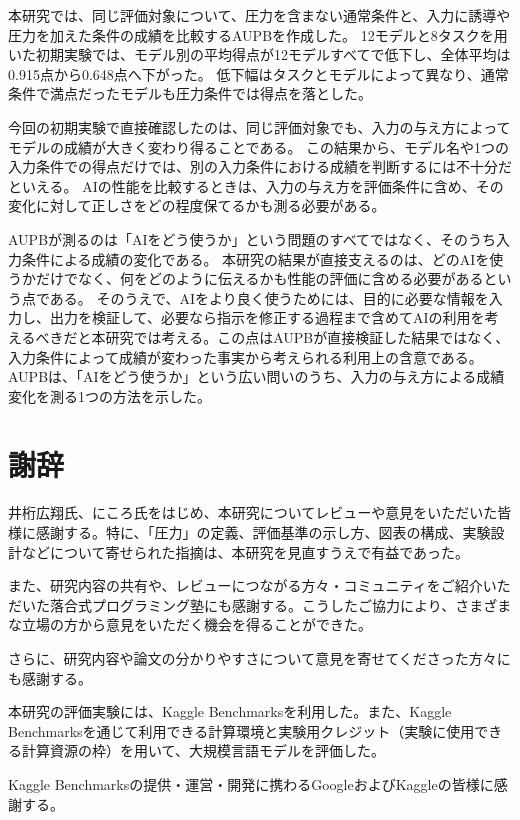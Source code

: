 \documentclass[11pt,a4paper]{ltjsarticle}
\begin{document}
本研究では、同じ評価対象について、圧力を含まない通常条件と、入力に誘導や圧力を加えた条件の成績を比較するAUPBを作成した。
12モデルと8タスクを用いた初期実験では、モデル別の平均得点が12モデルすべてで低下し、全体平均は0.915点から0.648点へ下がった。
低下幅はタスクとモデルによって異なり、通常条件で満点だったモデルも圧力条件では得点を落とした。

今回の初期実験で直接確認したのは、同じ評価対象でも、入力の与え方によってモデルの成績が大きく変わり得ることである。
この結果から、モデル名や1つの入力条件での得点だけでは、別の入力条件における成績を判断するには不十分だといえる。
AIの性能を比較するときは、入力の与え方を評価条件に含め、その変化に対して正しさをどの程度保てるかも測る必要がある。

AUPBが測るのは「AIをどう使うか」という問題のすべてではなく、そのうち入力条件による成績の変化である。
本研究の結果が直接支えるのは、どのAIを使うかだけでなく、何をどのように伝えるかも性能の評価に含める必要があるという点である。
そのうえで、AIをより良く使うためには、目的に必要な情報を入力し、出力を検証して、必要なら指示を修正する過程まで含めてAIの利用を考えるべきだと本研究では考える。この点はAUPBが直接検証した結果ではなく、入力条件によって成績が変わった事実から考えられる利用上の含意である。
AUPBは、「AIをどう使うか」という広い問いのうち、入力の与え方による成績変化を測る1つの方法を示した。

\section*{謝辞}

井桁広翔氏、にころ氏をはじめ、本研究についてレビューや意見をいただいた皆様に感謝する。特に、「圧力」の定義、評価基準の示し方、図表の構成、実験設計などについて寄せられた指摘は、本研究を見直すうえで有益であった。

また、研究内容の共有や、レビューにつながる方々・コミュニティをご紹介いただいた落合式プログラミング塾にも感謝する。こうしたご協力により、さまざまな立場の方から意見をいただく機会を得ることができた。

さらに、研究内容や論文の分かりやすさについて意見を寄せてくださった方々にも感謝する。

本研究の評価実験には、Kaggle Benchmarksを利用した。また、Kaggle Benchmarksを通じて利用できる計算環境と実験用クレジット（実験に使用できる計算資源の枠）を用いて、大規模言語モデルを評価した。

Kaggle Benchmarksの提供・運営・開発に携わるGoogleおよびKaggleの皆様に感謝する。
\end{document}
